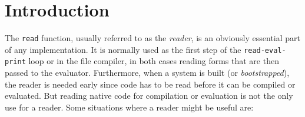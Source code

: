 \section{Introduction}

The \cl{}\cite{ansi:common:lisp}
\texttt{read} function, usually referred to as the \cl{}
\emph{reader}, is an obviously essential part of any \cl{}
implementation.  It is normally used as the first step of the
\texttt{read-eval-print} loop or in the file compiler, in both cases
reading forms that are then passed to the evaluator.  Furthermore,
when a \cl{} system is built (or \emph{bootstrapped}), the reader is
needed early since code has to be read before it can be compiled or
evaluated.  But reading native code for compilation or evaluation is
not the only use for a reader.  Some situations where a reader might
be useful are:

